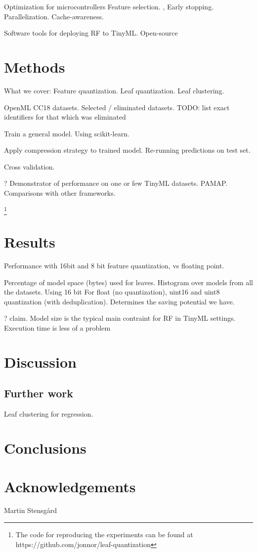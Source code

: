 \documentclass{article}
\begin{document}
Optimization for microcontrollers \cite{tabanelli_optimizing_2022}
Feature selection. \cite{uddin_guided_2015}, \cite{elsts_energy-efficient_2020}
Early stopping. \cite{daghero_low-overhead_2022} \cite{daghero_adaptive_2021}
Parallelization.
Cache-awareness.

Software tools for deploying RF to TinyML. Open-source


\section{Methods}

What we cover: Feature quantization. Leaf quantization. Leaf clustering.



OpenML CC18 datasets.
Selected / eliminated datasets.
TODO: list exact identifiers for that which was eliminated

Train a general model. Using scikit-learn.

Apply compression strategy to trained model. Re-running predictions on test set.

Cross validation.

? Demonstrator of performance on one or few TinyML datasets.
PAMAP.
Comparisons with other frameworks. 

\footnote{The code for reproducing the experiments can be found at https://github.com/jonnor/leaf-quantization}

\newpage
\section{Results}

Performance with 16bit and 8 bit feature quantization, vs floating point.


Percentage of model space (bytes) used for leaves.
Histogram over models from all the datasets. Using 16 bit 
For float (no quantization), uint16 and uint8 quantization (with deduplication).
Determines the saving potential we have.

? claim. Model size is the typical main contraint for RF in TinyML settings. Execution time is less of a problem

\section{Discussion}

\subsection{Further work}

Leaf clustering for regression.


\section{Conclusions}


\section*{Acknowledgements}
\noindent

Martin Stensgård

\newpage

 
\end{document}
